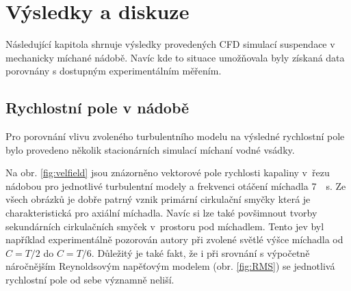 \chapter{Výsledky a diskuze}
Následující kapitola shrnuje výsledky provedených CFD simulací suspendace v mechanicky míchané nádobě. Navíc kde to situace umožňovala byly získaná data porovnány s dostupným experimentálním měřením.

\section{Rychlostní pole v nádobě}
Pro porovnání vlivu zvoleného turbulentního modelu na výsledné rychlostní pole bylo provedeno několik stacionárních simulací míchaní vodné vsádky. 

Na obr. \ref{fig:velfield} jsou znázorněno vektorové pole rychlosti kapaliny v~řezu nádobou pro jednotlivé turbulentní modely a frekvenci otáčení míchadla \SI{7}{\per\second}. Ze všech obrázků je dobře patrný vznik primární cirkulační smyčky která je charakteristická pro axiální míchadla. Navíc si lze také povšimnout tvorby sekundárních cirkulačních smyček v~prostoru pod míchadlem. Tento jev byl například experimentálně pozorován autory \citet{hos10} při zvolené světlé výšce míchadla od $C=T/2$ do $C=T/6$. Důležitý je také fakt, že i při srovnání s výpočetně náročnějším Reynoldsovým napěťovým modelem (obr. \ref{fig:RMS}) se jednotlivá rychlostní pole od sebe významně neliší.

